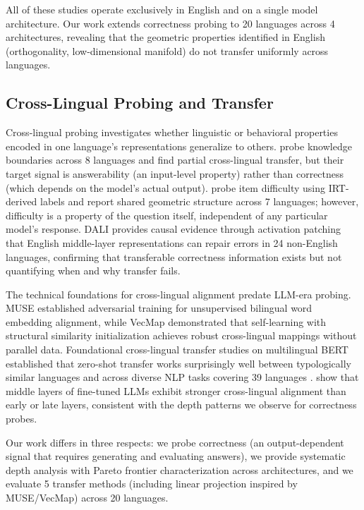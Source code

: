 All of these studies operate exclusively in English and on a single model architecture. Our work extends correctness probing to 20 languages across 4 architectures, revealing that the geometric properties identified in English (orthogonality, low-dimensional manifold) do not transfer uniformly across languages.

\subsection{Cross-Lingual Probing and Transfer}

Cross-lingual probing investigates whether linguistic or behavioral properties encoded in one language's representations generalize to others. \citet{xiao2025knowledge} probe knowledge boundaries across 8 languages and find partial cross-lingual transfer, but their target signal is answerability (an input-level property) rather than correctness (which depends on the model's actual output). \citet{civelli2026shared} probe item difficulty using IRT-derived labels and report shared geometric structure across 7 languages; however, difficulty is a property of the question itself, independent of any particular model's response. DALI \cite{ravisankar2026dali} provides causal evidence through activation patching that English middle-layer representations can repair errors in 24 non-English languages, confirming that transferable correctness information exists but not quantifying when and why transfer fails.

The technical foundations for cross-lingual alignment predate LLM-era probing. MUSE \cite{conneau2018muse} established adversarial training for unsupervised bilingual word embedding alignment, while VecMap \cite{artetxe2018vecmap} demonstrated that self-learning with structural similarity initialization achieves robust cross-lingual mappings without parallel data. Foundational cross-lingual transfer studies on multilingual BERT established that zero-shot transfer works surprisingly well between typologically similar languages \cite{pires2019multilingual} and across diverse NLP tasks covering 39 languages \cite{wu2019beto}. %
\citet{liu2025middle} show that middle layers of fine-tuned LLMs exhibit stronger cross-lingual alignment than early or late layers, consistent with the depth patterns we observe for correctness probes.

Our work differs in three respects: we probe correctness (an output-dependent signal that requires generating and evaluating answers), we provide systematic depth analysis with Pareto frontier characterization across architectures, and we evaluate 5 transfer methods (including linear projection inspired by MUSE/VecMap) across 20 languages.

